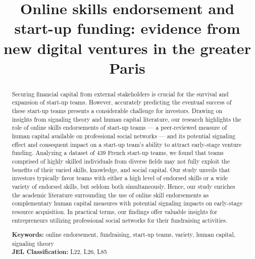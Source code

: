 \documentclass[12pt]{article}
\begin{document}
\title{{\large Online skills endorsement and start-up funding: evidence from new digital ventures in the greater Paris}}
\date{ }

\maketitle \vspace{-5em}

\begin{abstract}
\footnotesize
Securing financial capital from external stakeholders is crucial for the survival and expansion of start-up teams. However, accurately predicting the eventual success of these start-up teams presents a considerable challenge for investors. Drawing on insights from signaling theory and human capital literature, our research highlights the role of online skills endorsements of start-up teams — a peer-reviewed measure of human capital available on professional social networks — and its potential signaling effect and consequent impact on a start-up team's ability to attract early-stage venture funding. Analyzing a dataset of 439 French start-up teams, we found that teams comprised of highly skilled individuals from diverse fields may not fully exploit the benefits of their varied skills, knowledge, and social capital. Our study unveils that investors typically favor teams with either a high level of endorsed skills or a wide variety of endorsed skills, but seldom both simultaneously. Hence, our study enriches the academic literature surrounding the use of online skill endorsements as complementary human capital measures with potential signaling impacts on early-stage resource acquisition. In practical terms, our findings offer valuable insights for entrepreneurs utilizing professional social networks for their fundraising activities. \newline

\begin{obeylines}
\noindent \footnotesize{}{\textbf{Keywords:} online endorsement, fundraising, start-up teams, variety, human capital, signaling theory}
\noindent \footnotesize{\textbf{JEL Classification:} L22, L26, L85}
\end{obeylines}

\end{abstract}

\clearpage
\end{document}
